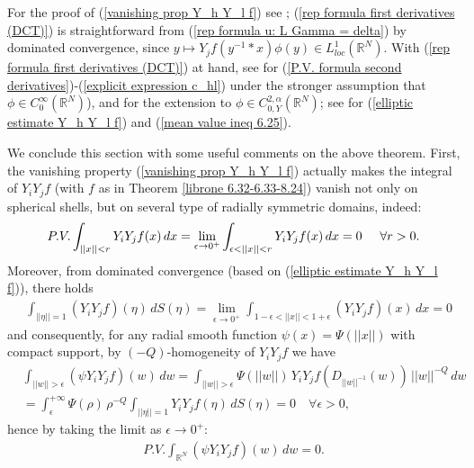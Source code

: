 \documentclass{article}
\numberwithin{equation}{section}
\begin{document}
\vspace{2mm}

\hspace{-7mm} For the proof of (\ref{vanishing prop Y_h Y_l f}) see \cite[Theorem 6.31]{librone}; (\ref{rep formula first derivatives (DCT)}) is straightforward from (\ref{rep formula u: L Gamma = delta}) by dominated convergence, since $y \mapsto Y_jf(y^{-1}*x) \phi(y) \in L^1_{loc}(\mathbb{R}^N)$. With (\ref{rep formula first derivatives (DCT)}) at hand, see \cite[Theorem 6.33]{librone} for (\ref{P.V. formula second derivatives})-(\ref{explicit expression c_hl}) under the stronger assumption that $\phi \in C^{\infty}_{0}(\mathbb{R}^N)$), and \cite[Proposition 8.49]{librone} for the extension to $\phi \in C^{2,\alpha}_{0,Y}(\mathbb{R}^N)$; see \cite[Lemma 8.24]{librone} for (\ref{elliptic estimate Y_h Y_l f}) and (\ref{mean value ineq 6.25}).

\vspace{2mm}

We conclude this section with some useful comments on the above theorem. First, the vanishing property (\ref{vanishing prop Y_h Y_l f}) actually makes the integral of $Y_i Y_j f$ (with $f$ as in Theorem \ref{librone 6.32-6.33-8.24}) vanish not only on spherical shells, but on several type of radially symmetric domains, indeed:
    \begin{equation}
        P.V. \int_{||x||<r} Y_i Y_j f(x) \, dx = \lim_{\epsilon \to 0^+} \int_{\epsilon < ||x|| < r} Y_i Y_j f(x) \, dx = 0 \hspace{5mm} \forall r>0.
    \end{equation}
    Moreover, from dominated convergence (based on (\ref{elliptic estimate Y_h Y_l f})), there holds
    \begin{align*}
        & \int_{||\eta||=1} (Y_i Y_j f)(\eta) \, dS(\eta) = \lim_{\epsilon \to 0^+} \int_{1-\epsilon < ||x|| < 1+\epsilon} (Y_i Y_j f)(x) \, dx = 0
    \end{align*}
    and consequently, for any radial smooth function $\psi(x) = \Psi(||x||)$ with compact support, by $(-Q)$-homogeneity of $Y_i Y_j f$ we have
    \begin{align}
        & \nonumber \int_{||w||>\epsilon} (\psi Y_i Y_j f)(w) \, dw = \int_{||w||>\epsilon} \Psi(||w||) \, Y_i Y_j f(D_{||w||^{-1}}(w)) \, ||w||^{-Q} \, dw \\
        & \label{vanishing int with radial psi} = \int_{\epsilon}^{+\infty}\Psi(\rho) \, \rho^{-Q} \int_{||\eta||=1} Y_i Y_j f(\eta) \, dS(\eta) = 0 \quad \forall \epsilon > 0,
    \end{align}
    hence by taking the limit as $\epsilon \to 0^+$:
    \begin{align}
    \label{vanishing P.V. int on R^N}
        P.V.  \int_{\mathbb{R}^N} (\psi Y_i Y_j f)(w) \, dw = 0.
    \end{align}
    
\end{document}
